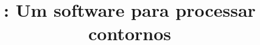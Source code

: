 \documentclass{article}
\title{\termo{Goiaba}: Um software para processar contornos}
\author{}
\begin{document}
\graphicspath{{figs/}{out/}{data/}{lily/}}

\maketitle

\begin{abstract}
  
\end{abstract}





\end{document}
